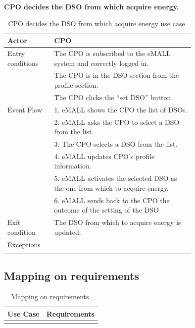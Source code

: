 \textbf{CPO decides the DSO from which acquire energy.}
\begin{center}
    \begin{longtable}{lp{0.75\linewidth}}
        \hline
        Actor            & CPO                                                                          \\
        \hline
        Entry conditions & The CPO is subscribed to the eMALL system and correctly logged in.           \\
        & The CPO is in the DSO section from the profile section.                      \\
        & The CPO clicks the “set DSO” button.                                         \\
        \hline
        Event Flow       & 1. eMALL shows the CPO the list of DSOs.                                     \\
        & 2. eMALL asks the CPO to select a DSO from the list.                         \\
        & 3. The CPO selects a DSO from the list.                                      \\
        & 4. eMALL updates CPO’s profile information.                                  \\
        & 5. eMALL activates the selected DSO as the one from which to acquire energy. \\
        & 6. eMALL sends back to the CPO the outcome of the setting of the DSO         \\
        \hline
        Exit condition   & The DSO from which to acquire energy is updated.                             \\
        \hline
        Exceptions       &                                                                              \\
        \hline
        \caption{CPO decides the DSO from which acquire energy use case.}
        \label{tab: CPO_decides_DSO_use_case}
    \end{longtable}
\end{center}

\subsection{Mapping on requirements}
\label{subsec: map_on_req}%
\setcounter{mr}{1}
\newcommand{\cmr}{\themr\stepcounter{mr}}
\begin{center}
    \begin{longtable}{|l|l|}
        \hline
        \textbf{Use Case} & \textbf{Requirements} \\
        \hline
        \caption{Mapping on requirements.}
        \label{tab: map_on_req}
    \end{longtable}
\end{center}


